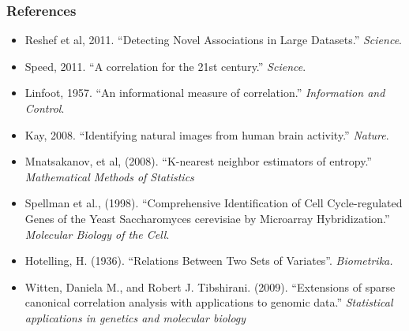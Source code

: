 \documentclass{beamer}
\begin{document}
\begin{frame}
\frametitle{References}
{\tiny
\begin{itemize}
\item Reshef et al, 2011. ``Detecting Novel Associations in Large Datasets.'' \emph{Science}.
\item Speed, 2011. ``A correlation for the 21st century.'' \emph{Science}.
\item Linfoot, 1957.  ``An informational measure of correlation.''  \emph{Information and Control}.
\item Kay, 2008.  ``Identifying natural images from human brain activity.''  \emph{Nature}.
\item Mnatsakanov, et al, (2008). ``K-nearest neighbor estimators of entropy.'' \emph{Mathematical Methods of Statistics}
\item Spellman et al., (1998).  ``Comprehensive Identification of Cell Cycle-regulated Genes of the Yeast Saccharomyces cerevisiae by Microarray Hybridization.''  \emph{Molecular Biology of the Cell}. 
\item Hotelling, H. (1936). ``Relations Between Two Sets of Variates''. \emph{Biometrika.}
\item Witten, Daniela M., and Robert J. Tibshirani. (2009). ``Extensions of sparse canonical correlation analysis with applications to genomic data.'' \emph{Statistical applications in genetics and molecular biology}
\end{itemize}
}
\end{frame}
\end{document}
